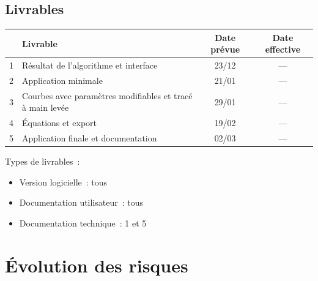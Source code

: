 \documentclass{beamer}
\begin{document}
	\subsection{Livrables}
	\begin{frame}{\subsecname}
		\begin{center}
		{\renewcommand{\arraystretch}{1.2}
		\begin{tabular}{|c|m{4.5cm}|c|c|} %
			\hline
			\textbf{\No} & \textbf{Livrable} & \textbf{Date pr\'evue} & 
			\textbf{Date effective}\\
			\hline
			1 & R\'esultat de l'algorithme et interface & 23/12 & ---\\
			\hline
			2 & Application minimale & 21/01 & ---\\
			\hline
			3 & Courbes avec paramètres modifiables et trac\'e \`a main lev\'ee
			& 29/01 & ---\\
			\hline
			4 & \'Equations et export & 19/02 & ---\\
			\hline
			5 & Application finale et documentation & 02/03 & ---\\
			\hline
		\end{tabular}}
		\end{center}
		Types de livrables~:
		\begin{itemize}
			\item Version logicielle~: tous
			\item Documentation utilisateur~: tous
			\item Documentation technique~: 1 et 5
		\end{itemize}
	\end{frame}




\section{\'Evolution des risques}
\end{document}
